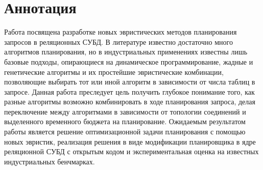 
\centering \section*{Аннотация}
\begin{flushleft}
Работа посвящена разработке новых эвристических методов планирования запросов в реляционных СУБД. В литературе известно достаточно много алгоритмов планирования, 
но в индустриальных применениях известны лишь базовые подходы, опирающиеся на динамическое программирование, жадные и генетические алгоритмы и их простейшие 
эвристические комбинации, позволяющие выбирать тот или иной алгоритм в зависимости от числа таблиц в запросе. Данная работа преследует цель получить глубокое понимание 
того, как разные алгоритмы возможно комбинировать в ходе планирования запроса, делая переключение между алгоритмами в зависимости от топологии соединений и выделенного 
временного бюджета на планирование. Ожидаемым результатом работы является решение оптимизационной задачи планирования с помощью новых эвристик, реализация решения в 
виде модификации планировщика в ядре реляционной СУБД с открытым кодом и экспериментальная оценка на известных индустриальных бенчмарках.
\end{flushleft}